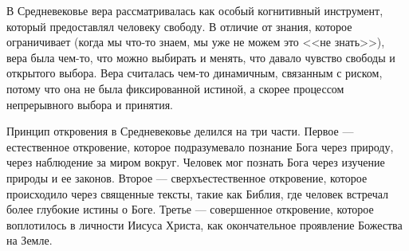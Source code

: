 
В Средневековье вера рассматривалась как особый когнитивный инструмент, который предоставлял человеку свободу. В отличие от знания, которое ограничивает (когда мы что-то знаем, мы уже не можем это <<не знать>>), вера была чем-то, что можно выбирать и менять, что давало чувство свободы и открытого выбора. Вера считалась чем-то динамичным, связанным с риском, потому что она не была фиксированной истиной, а скорее процессом непрерывного выбора и принятия.

Принцип откровения в Средневековье делился на три части. Первое --- естественное откровение, которое подразумевало познание Бога через природу, через наблюдение за миром вокруг. Человек мог познать Бога через изучение природы и ее законов. Второе --- сверхъестественное откровение, которое происходило через священные тексты, такие как Библия, где человек встречал более глубокие истины о Боге. Третье --- совершенное откровение, которое воплотилось в личности Иисуса Христа, как окончательное проявление Божества на Земле.

